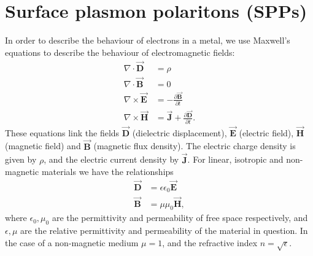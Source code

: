 \section{Surface plasmon polaritons (SPPs)}
In order to describe the behaviour of electrons in a metal, we use Maxwell's equations to describe the behaviour of electromagnetic fields:
\begin{subequations}
\label{Maxwell}
\begin{align}
\nabla \cdot \vec{\mathbf{D}} &= \rho \label{Maxwell1}\\
\nabla \cdot \vec{\mathbf{B}} &= 0 \label{Maxwell2}\\
\nabla \times \vec{\mathbf{E}} &= - \frac{\partial \vec{\mathbf{B}}}{\partial t} \label{Maxwell3}\\
\nabla \times \vec{\mathbf{H}} &= \vec{\mathbf{J}} + \frac{\partial \vec{\mathbf{D}}}{\partial t} \label{Maxwell4}. 
\end{align}
\end{subequations}
These equations link the fields $\vec{\mathbf{D}}$ (dielectric displacement), $\vec{\mathbf{E}}$ (electric field), $\vec{\mathbf{H}}$ (magnetic field) and $\vec{\mathbf{B}}$ (magnetic flux density). The electric charge density is given by $\rho$, and the electric current density by $\vec{\mathbf{J}}$. For linear, isotropic and non-magnetic materials we have the relationships
\begin{subequations}
\label{fieldrelations}
\begin{align}
\vec{\mathbf{D}} &= \epsilon \epsilon_0 \vec{\mathbf{E}} \label{DE}\\
\vec{\mathbf{B}} &= \mu \mu_0 \vec{\mathbf{H}} \label{BH},
\end{align}
\end{subequations}
where $\epsilon_0, \mu_0$ are the permittivity and permeability of free space respectively, and $\epsilon, \mu$ are the relative permittivity and permeability of the material in question. In the case of a non-magnetic medium $\mu=1$, and the refractive index $n=\sqrt{\epsilon}$.

